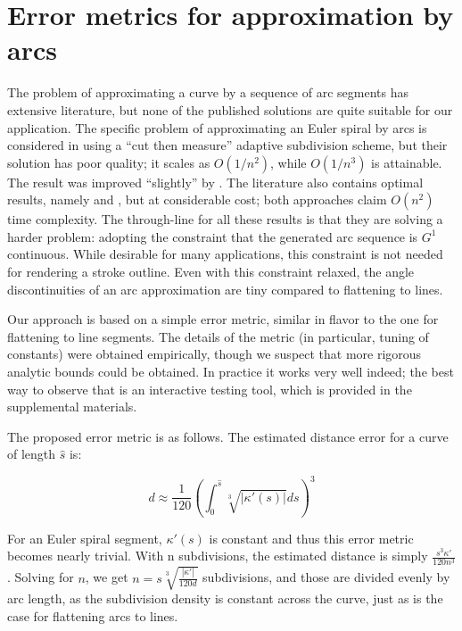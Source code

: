 \documentclass[sigconf, authordraft]{acmart}
\begin{document}
\section{Error metrics for approximation by arcs}

The problem of approximating a curve by a sequence of arc segments has extensive literature, but none of the published solutions are quite suitable for our application. The specific problem of approximating an Euler spiral by arcs is considered in \cite{Meek2004} using a ``cut then measure'' adaptive subdivision scheme, but their solution has poor quality; it scales as $O(1/n^2)$, while $O(1/n^3)$ is attainable. The result was improved ``slightly'' by \cite{Narayan2014}. The literature also contains optimal results, namely \cite{Maier2014} and \cite{Nuntawisuttiwong2021}, but at considerable cost; both approaches claim $O(n^2)$ time complexity. The through-line for all these results is that they are solving a harder problem: adopting the constraint that the generated arc sequence is $G^1$ continuous. While desirable for many applications, this constraint is not needed for rendering a stroke outline. Even with this constraint relaxed, the angle discontinuities of an arc approximation are tiny compared to flattening to lines.


Our approach is based on a simple error metric, similar in flavor to the one for flattening to line segments. The details of the metric (in particular, tuning of constants) were obtained empirically, though we suspect that more rigorous analytic bounds could be obtained. In practice it works very well indeed; the best way to observe that is an interactive testing tool, which is provided in the supplemental materials.

The proposed error metric is as follows. The estimated distance error for a curve of length $\hat{s}$ is:

\[
    d \approx \frac{1}{120}\left(\int_0^{\hat{s}} \sqrt[3]{|\kappa'(s)|}ds \right)^3
\]

For an Euler spiral segment, $\kappa'(s)$ is constant and thus this error metric becomes nearly trivial. With n subdivisions, the estimated distance is simply $\frac{s^3\kappa'}{120n^3}$. Solving for $n$, we get $n = s\sqrt[3]{\frac{|\kappa'|}{120d}}$ subdivisions, and those are divided evenly by arc length, as the subdivision density is constant across the curve, just as is the case for flattening arcs to lines.
\end{document}
